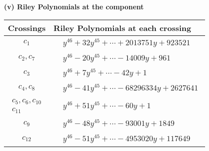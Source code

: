 \documentclass[1p]{elsarticle_modified}
\theoremstyle{definition}
\begin{document}
\newpage\renewcommand{\arraystretch}{1}
\flushleft \textbf{(v) Riley Polynomials at the component}\newline \\
\begin{tabular}{m{50pt}|m{274pt}}
Crossings & \hspace{64pt}Riley Polynomials at each crossing \\
\hline $$\begin{aligned}c_{1}\end{aligned}$$&$\begin{aligned}
&y^{46}+32 y^{45}+\cdots+2013751 y+923521
\end{aligned}$\\
\hline $$\begin{aligned}c_{2},c_{7}\end{aligned}$$&$\begin{aligned}
&y^{46}-20 y^{45}+\cdots-14009 y+961
\end{aligned}$\\
\hline $$\begin{aligned}c_{3}\end{aligned}$$&$\begin{aligned}
&y^{46}+7 y^{45}+\cdots-42 y+1
\end{aligned}$\\
\hline $$\begin{aligned}c_{4},c_{8}\end{aligned}$$&$\begin{aligned}
&y^{46}-41 y^{45}+\cdots-68296334 y+2627641
\end{aligned}$\\
\hline $$\begin{aligned}c_{5},c_{6},c_{10}\\c_{11}\end{aligned}$$&$\begin{aligned}
&y^{46}+51 y^{45}+\cdots-60 y+1
\end{aligned}$\\
\hline $$\begin{aligned}c_{9}\end{aligned}$$&$\begin{aligned}
&y^{46}-48 y^{45}+\cdots-93001 y+1849
\end{aligned}$\\
\hline $$\begin{aligned}c_{12}\end{aligned}$$&$\begin{aligned}
&y^{46}-51 y^{45}+\cdots-4953020 y+117649
\end{aligned}$\\
\hline
\end{tabular}\\~\\
\end{document}
